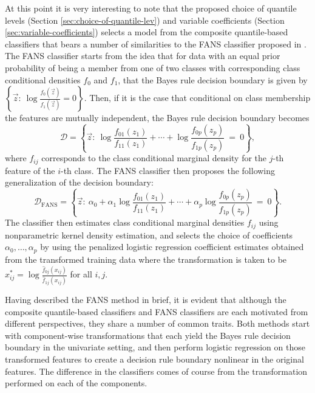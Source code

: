 At this point it is very interesting to note that the proposed choice of
quantile levels (Section \ref{sec:choice-of-quantile-lev}) and variable
coefficients (Section \ref{sec:variable-coefficients}) selects a model from the
composite quantile-based classifiers that bears a number of similarities to the
FANS classifier proposed in \cite{fan2016}.  The FANS classifier starts from the
idea that for data with an equal prior probability of being a member from one of
two classes with corresponding class conditional densities $f_0$ and $f_1$, that
the Bayes rule decision boundary is given by
$\left\{ \vec{z}{:}~ \log \frac{ f_0(\vec{z}) }{ f_1(\vec{z}) } = 0 \right\}$.
Then, if it is the case that conditional on class membership the features are
mutually independent, the Bayes rule decision boundary becomes
\begin{equation}
  \label{eq:bayes-rule-independent}
  \mathcal{D} = \left\{
    \vec{z} :~
    \log \frac{ f_{01}(z_1) }{ f_{11}(z_1) } +
    \cdots +
    \log \frac{ f_{0p}(z_p) }{ f_{1p}(z_p) }
    ~=~ 0
  \right\} ,
\end{equation}
where $f_{ij}$ corresponds to the class conditional marginal density for the
$j$-th feature of the $i$-th class.  The FANS classifier then proposes the
following generalization of the decision boundary:
\begin{equation}
  \label{eq:fans-rule}
  \mathcal{D}_{\scriptscriptstyle \text{FANS}} = \left\{
    \vec{z} :~ \alpha_0 + 
    \alpha_1 \log \frac{ f_{01}(z_1) }{ f_{11}(z_1) } +
    \cdots +
    \alpha_p \log \frac{ f_{0p}(z_p) }{ f_{1p}(z_p) }
    ~=~ 0
  \right\}.
\end{equation}
The classifier then estimates class conditional marginal densities $f_{ij}$
using nonparametric kernel density estimation, and selects the choice of
coefficients $\alpha_0, \dots, \alpha_p$ by using the penalized logistic
regression coefficient estimates obtained from the transformed training data
where the transformation is taken to be
$x_{ij}^{*} = \log \frac{ \hat{f}_{0j}(x_{ij}) }{ \hat{f}_{1j}(x_{ij}) }$ for
all $i, j$.

Having described the FANS method in brief, it is evident that although the
composite quantile-based classifiers and FANS classifiers are each motivated
from different perspectives, they share a number of common traits.  Both methods
start with component-wise transformations that each yield the Bayes rule
decision boundary in the univariate setting, and then perform logistic
regression on those transformed features to create a decision rule boundary
nonlinear in the original features.  The difference in the classifiers comes of
course from the transformation performed on each of the components.

